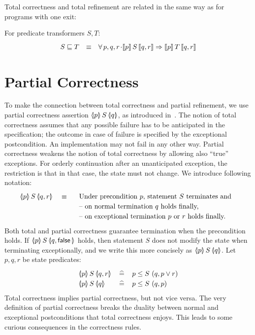 \documentclass[submission,copyright,creativecommons]{eptcs}
\newcommand{\KW}[1]{\mathop{\sf #1}}
\newcommand{\FALSE}{\KW{false}}
\newcommand{\dis}{\vee}
\newcommand{\imp}{\Rightarrow}
\renewcommand{\dot}{\mathop{.}}
\newcommand{\defeq}{\left.\widehat{=}\right.}
\newcommand{\refby}{\sqsubseteq}
\newcommand{\TOTAL}[3]{[\hspace{-.15em}[#1]\hspace{-.15em}]\,#2\,[\hspace{-.15em}[#3]\hspace{-.15em}]}
\newcommand{\PARTIAL}[3]{\langle\hspace{-.2em}|#1|\hspace{-.2em}\rangle\,#2\,\langle\hspace{-.2em}|#3|\hspace{-.2em}\rangle}
\begin{document}
Total correctness and total refinement are related in the same way as for programs with one exit:
\begin{theorem}
\label{thm:total_rel}
For predicate transformers $S, T$:
\[\renewcommand{\arraystretch}{1.2}\begin{array}{rcl}
  S \refby T & \equiv & \forall\, p, q, r \dot \TOTAL{p}{S}{q, r} \imp \TOTAL{p}{T}{q, r}
\end{array}\]
\end{theorem}

\section{Partial Correctness}
\label{sec:paco}

To make the connection between total correctness and partial refinement, we use partial correctness assertion $\PARTIAL{p}{S}{q}$, as introduced in~\cite{SekerinskiZhang11PartialCorrectness}. The notion of total correctness assumes that any possible failure has to be anticipated in the specification; the outcome in case of failure is specified by the exceptional postcondition. An implementation may not fail in any other way. Partial correctness weakens the notion of total correctness by allowing also ``true'' exceptions. For orderly continuation after an unanticipated exception, the restriction is that in that case, the state must not change. We introduce following notation:
\[
  \PARTIAL{p}{S}{q, r} \quad\equiv\quad
    \begin{array}[t]{l}
      \textrm{Under precondition $p$, statement $S$ terminates and } \\
      \textrm{-- on normal termination $q$ holds finally,} \\
      \textrm{-- on exceptional termination $p$ or $r$ holds finally.}
    \end{array}
\]
Both total and partial correctness guarantee termination when the precondition holds. If $\PARTIAL{p}{S}{q, \FALSE}$ holds, then statement $S$ does not modify the state when terminating exceptionally, and we write this more concisely as $\PARTIAL{p}{S}{q}$. Let $p, q, r$ be state predicates:
\[\renewcommand{\arraystretch}{1.2}\begin{array}{lll}
  \PARTIAL{p}{S}{q, r}& \defeq & p \leq S \ (q, p \dis r) \\
  \PARTIAL{p}{S}{q}   & \defeq & p \leq S \ (q, p)
\end{array}\]
Total correctness implies partial correctness, but not vice versa. The very definition of partial correctness breaks the duality between normal and exceptional postconditions that total correctness enjoys. This leads to some curious consequences in the correctness rules.
\end{document}
